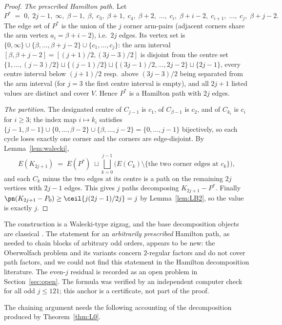 \begin{proof}
\emph{The prescribed Hamilton path.} Let
\[
P^* \;=\; 0,\;2j-1,\;\infty,\;\beta-1,\;\beta,\;c_3,\;\beta+1,\;c_4,\;\beta+2,\;\dots,\;
c_i,\;\beta+i-2,\;c_{i+1},\;\dots,\;c_j,\;\beta+j-2 .
\]
The edge set of $P^*$ is the union of the $j$ corner arm-pairs (adjacent corners share the arm
vertex $a_i=\beta+i-2$), i.e.\ $2j$ edges. Its vertex set is
$\{0,\infty\}\cup\{\beta,\dots,\beta+j-2\}\cup\{c_1,\dots,c_j\}$: the arm interval
$[\beta,\beta+j-2]=[(j+1)/2,(3j-3)/2]$ is disjoint from the centre set
$\{1,\dots,(j-3)/2\}\sqcup\{(j-1)/2\}\sqcup\{(3j-1)/2,\dots,2j-2\}\sqcup\{2j-1\}$,
every centre interval below $(j+1)/2$ resp.\ above $(3j-3)/2$ being separated from the arm
interval (for $j=3$ the first centre interval is empty), and all $2j+1$ listed values are
distinct and cover $V$. Hence $P^*$ is a Hamilton path with $2j$ edges.

\emph{The partition.}
The designated centre of $C_{j-1}$ is $c_1$, of $C_{\beta-1}$ is $c_2$, and of $C_{k_i}$ is
$c_i$ for $i\ge3$; the index map $i\mapsto k_i$ satisfies
$\{j-1,\beta-1\}\cup\{0,\dots,\beta-2\}\cup\{\beta,\dots,j-2\}=\{0,\dots,j-1\}$ bijectively, so
each cycle loses exactly one corner and the corners are edge-disjoint. By
Lemma~\ref{lem:walecki},
\[
E(K_{2j+1})\;=\;E(P^*)\;\sqcup\bigsqcup_{k=0}^{j-1}\bigl(E(C_k)\setminus\{\text{the two corner
edges at } c_{k}\}\bigr),
\]
and each $C_k$ minus the two edges at its centre is a path on the remaining $2j$ vertices with
$2j-1$ edges. This gives $j$ paths decomposing $K_{2j+1}-P^*$. Finally
$\pn(K_{2j+1}-P_0)\ge\ceil{j(2j-1)/2j}=j$ by Lemma~\ref{lem:LB2}, so the value is exactly $j$.
\end{proof}

\begin{remark}
The construction is a Walecki-type zigzag, and the base decomposition objects are classical
\cite{LP92,Alspach08}. The statement for an \emph{arbitrarily prescribed} Hamilton path, as
needed to chain blocks of arbitrary odd orders, appears to be new: the Oberwolfach problem and
its variants concern $2$-regular factors and do not cover path factors, and we could not find
this statement in the Hamilton decomposition literature. The even-$j$ residual is recorded as
an open problem in Section~\ref{sec:open}. The formula was verified by an independent computer
check for all odd $j\le121$; this anchor is a certificate, not part of the proof.
\end{remark}

The chaining argument needs the following accounting of the decomposition produced by
Theorem~\ref{thm:L0}.

